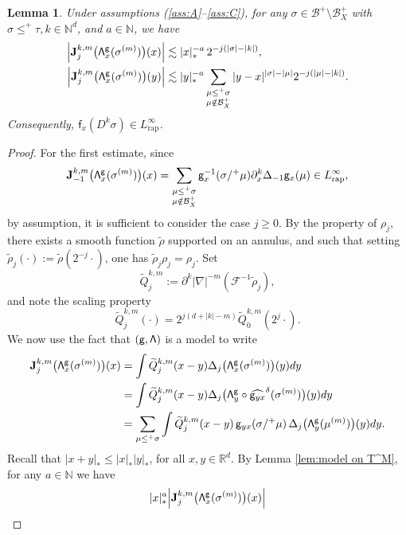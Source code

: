 \documentclass[JEP,XML,SOM,Unicode,published]{cedram}
\theoremstyle{plain}
\newtheorem{lem}[thm]{Lemma}
\theoremstyle{definition}
\newcommand{\rap}{\mathrm{rap}}
\newcommand{\bfJ}{\mathbf{J}}
\newcommand{\sff}{\mathsf{f}}
\newcommand{\sfg}{\mathsf{g}}
\newcommand{\bbN}{\mathbb{N}}
\newcommand{\bbR}{\mathbb{R}}
\newcommand{\mcB}{\mathcal{B}}
\newcommand{\mcF}{\mathcal{F}}
\begin{document}
\begin{lem} \label{lem:I_j^k}
Under assumptions \textup{(\ref{ass:A}--\ref{ass:C})}, for any $\sigma\in\mcB^+\setminus\mcB_X^+$ with $\sigma\le^+\tau, k\in\bbN^d$, and $a\in\bbN$, we have
\begin{align*}
\Big|\bfJ_j^{k,m}\bigl({\sf\Lambda}^{\sfg}_x(\sigma^{(m)})\bigr)(x)\Big| &\lesssim|x|_*^{-a}\,2^{-j(|\sigma|-|k|)}, \\
\Big|\bfJ_j^{k,m}\bigl({\sf\Lambda}^{\sfg}_x(\sigma^{(m)})\bigr)(y)\Big| &\lesssim|y|_*^{-a}\sum_{\substack{\mu\le^+\sigma\\\mu\notin\mcB_X^+}}|y-x|^{|\sigma|-|\mu|}2^{-j(|\mu|-|k|)}.
\end{align*}
Consequently, $\sff_x(D^k\sigma)\in L_\rap^\infty$.
\end{lem}

\begin{proof}
For the first estimate, since
\[
\bfJ_{-1}^{k,m}\bigl({\sf\Lambda}^{\sfg}_x(\sigma^{(m)})\bigr)(x) = \sum_{\substack{\mu\leq^+\sigma\\\mu\notin\mcB_X^+}}\sfg_x^{-1}(\sigma/^+\mu)\partial_x^k\Delta_{-1}\sfg_x(\mu) \in L_\rap^\infty,
\]
by assumption, it is sufficient to consider the case $j\ge0$. By the property of $\rho_j$, there exists a smooth function $\tilde\rho$ supported on an annulus, and such that setting $\tilde\rho_j(\cdot) := \tilde\rho(2^{-j}\cdot)$, one has $\widetilde{\rho}_j\rho_j=\rho_j$. Set
\[
\widetilde{Q}_j^{k,m} := \partial^k|\nabla|^{-m}(\mcF^{-1}\tilde{\rho}_j),
\]
and note the scaling property
\[
\widetilde{Q}_j^{k,m}(\cdot) = 2^{j(d+|k|-m)}\widetilde{Q}_0^{k,m}(2^j\cdot).
\]
We now use the fact that $\sf (g,\Lambda)$ is a model to write
\begin{align*}
\bfJ_j^{k,m}\bigl({\sf \Lambda}^{\sfg}_x(\sigma^{(m)})\bigr)(x)
&=\int \widetilde{Q}_j^{k,m}(x-y)\Delta_j\bigl({\sf\Lambda}^{\sfg}_x(\sigma^{(m)})\bigr)(y)dy \\
&=\int \widetilde{Q}_j^{k,m}(x-y)\Delta_j\bigl({\sf\Lambda}^{\sfg}_y\circ\widehat{\sfg_{yx}}^\delta(\sigma^{(m)})\bigr)(y)dy \\
&=\sum_{\mu\le^+\sigma} \int \widetilde{Q}_j^{k,m}(x-y)\,\sfg_{yx}(\sigma/^+\mu)\,\Delta_j\bigl({\sf\Lambda}^{\sfg}_y(\mu^{(m)})\bigr)(y)dy.
\end{align*}
Recall that $|x+y|_*\leq |x|_* |y|_*$, for all $x,y\in\bbR^d$. By Lemma \ref{lem:model on T^M}, for any $a\in\bbN$ we have
\begin{align*}
|x|_*^a\Big|\bfJ_j^{k,m}&\bigl({\sf\Lambda}^{\sfg}_x(\sigma^{(m)})\bigr)(x)\Big| \\

\end{align*}
\end{proof}
\end{document}
